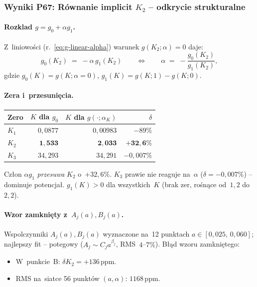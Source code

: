 \subsubsection{Wyniki P67: R\'ownanie implicit $K_2$ -- odkrycie strukturalne}
\label{app:F-P67}

\paragraph{Rozkl{}ad $g = g_0 + \alpha g_1$.}
Z~liniowo\'sci (r.~\ref{eq:g-linear-alpha}) warunek $g(K_2;\alpha)=0$ daje:
\begin{equation}
  \boxed{g_0(K_2) \;=\; -\alpha\,g_1(K_2)
  \qquad\Longleftrightarrow\qquad
  \alpha \;=\; -\frac{g_0(K_2)}{g_1(K_2)},}
  \label{eq:K2-implicit}
\end{equation}
gdzie $g_0(K)=g(K;\alpha=0)$, $g_1(K)=g(K;1)-g(K;0)$.

\paragraph{Zera i~przes{}uni\k{e}cia.}
\begin{center}
\begin{tabular}{l|rr|r}
\hline
Zero & $K$ dla $g_0$ & $K$ dla $g(\cdot;\alpha_K)$ & $\delta$ \\
\hline
$K_1$ & $0{,}0877$ & $0{,}00983$ & $-89\%$ \\
$K_2$ & $\mathbf{1{,}533}$ & $\mathbf{2{,}033}$ & $\mathbf{+32{,}6\%}$ \\
$K_3$ & $34{,}293$ & $34{,}291$ & $-0{,}007\%$ \\
\hline
\end{tabular}
\end{center}
Cz\l{}on $\alpha g_1$ \emph{przesuwa} $K_2$ o~$+32{,}6\%$.
$K_3$ prawie nie reaguje na~$\alpha$ ($\delta=-0{,}007\%$) -- dominuje potencja\l{}.
$g_1(K)>0$ dla wszystkich~$K$ (brak zer, ro\'sn\k{a}ce od~$1{,}2$ do~$2{,}2$).

\paragraph{Wzor zamkni\k{e}ty z~$A_j(a),B_j(a)$.}
Wspolczynniki $A_j(a), B_j(a)$ wyznaczone na~12 punktach $a\in[0{,}025,\,0{,}060]$;
najlepszy fit -- potegowy ($A_j \sim C_j a^{\beta_j}$, RMS~$4$--$7\%$).
B\l{}\k{a}d wzoru zamkni\k{e}tego:
\begin{itemize}
  \item W~punkcie~B: $\delta K_2=+136\,\mathrm{ppm}$.
  \item RMS na~siatce 56 punkt\'ow $(a,\alpha)$: $1168\,\mathrm{ppm}$.
\end{itemize}

